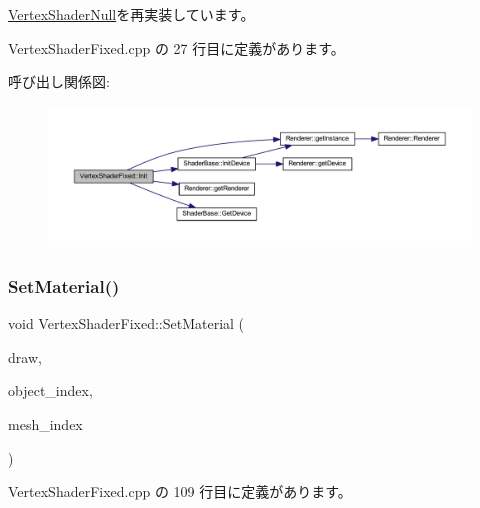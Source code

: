 \mbox{\hyperlink{class_vertex_shader_null_af30eb8057fe0537bc6ade214647b6fb5}{Vertex\+Shader\+Null}}を再実装しています。



 Vertex\+Shader\+Fixed.\+cpp の 27 行目に定義があります。

呼び出し関係図\+:
\nopagebreak
\begin{figure}[H]
\begin{center}
\leavevmode
\includegraphics[width=350pt]{class_vertex_shader_fixed_ae829ff736b33c45543804059255125b6_cgraph}
\end{center}
\end{figure}
\mbox{\label{class_vertex_shader_fixed_a05ce5fdd8ff190b9934497f42cf19a38}} 
\subsubsection{\texorpdfstring{Set\+Material()}{SetMaterial()}}
{\footnotesize\ttfamily void Vertex\+Shader\+Fixed\+::\+Set\+Material (\begin{DoxyParamCaption}\item[{\mbox{\hyperlink{class_draw_base}{Draw\+Base}} $\ast$}]{draw,  }\item[{unsigned}]{object\+\_\+index,  }\item[{unsigned}]{mesh\+\_\+index }\end{DoxyParamCaption})\hspace{0.3cm}{\ttfamily [private]}}



 Vertex\+Shader\+Fixed.\+cpp の 109 行目に定義があります。

